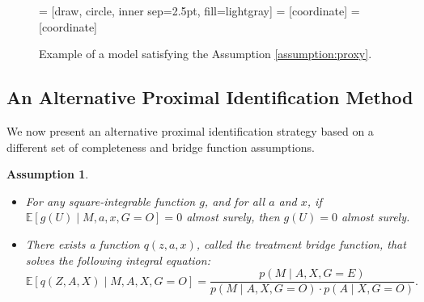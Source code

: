 \documentclass[10pt]{article}
\newtheorem{assumption}{Assumption}
\newcommand{\E}{\mathbb{E}}
\begin{document}
\begin{figure}[t!]
\centering
		 = [draw, circle, inner sep=2.5pt, fill=lightgray]
		 = [coordinate]
		 = [coordinate]
        \caption{Example of a model satisfying the Assumption \ref{assumption:proxy}.}
        \label{fig:prox}
\end{figure}

\subsection{An Alternative Proximal Identification Method}


We now present an alternative proximal identification strategy based on a different set of completeness and bridge function assumptions.

\newpage
\begin{assumption}
\label{assumption:compexist2}
~
\vspace{-3mm}
\begin{itemize}
    \item[(i)] For any square-integrable function \( g \), and for all \( a \) and \( x \), if \( \E[g(U) \mid M, a, x, G=O] = 0 \) almost surely, then \( g(U) = 0 \) almost surely.

    \item[(ii)] There exists a function \( q(z, a, x) \), called the \emph{treatment bridge function}, that solves the following integral equation:
    \begin{equation*}
    \E[q(Z, A, X) \mid M, A, X, G=O] = \frac{p(M \mid A, X, G=E)}{p(M \mid A, X, G=O) \cdot p(A \mid X, G=O)}.
    \end{equation*}
\end{itemize}
\end{assumption}
\end{document}
